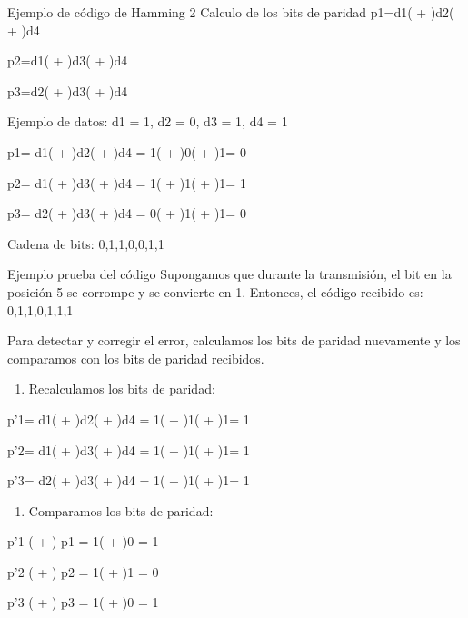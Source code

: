 \documentclass[presentation]{beamer}
\begin{document}
\begin{frame}[label={sec:org555a910}]{Ejemplo de código de Hamming 2}
Calculo de los bits de paridad
p1=d1( + )d2( + )d4

p2=d1( + )d3( + )d4

p3=d2( + )d3( + )d4

Ejemplo de datos:
d1 = 1, d2 = 0, d3 = 1, d4 = 1

p1= d1( + )d2( + )d4 = 1( + )0( + )1= 0

p2= d1( + )d3( + )d4 = 1( + )1( + )1= 1

p3= d2( + )d3( + )d4 = 0( + )1( + )1= 0

Cadena de bits: 0,1,1,0,0,1,1
\end{frame}

\begin{frame}[label={sec:org6e7dd0b}]{Ejemplo prueba del código}
Supongamos que durante la transmisión, el bit en la posición 5 se corrompe y se convierte en 1. Entonces, el código recibido es:
0,1,1,0,1,1,1

Para detectar y corregir el error, calculamos los bits de paridad nuevamente y los comparamos con los bits de paridad recibidos.

\begin{enumerate}
\item Recalculamos los bits de paridad:
\end{enumerate}
p'1= d1( + )d2( + )d4 = 1( + )1( + )1= 1

p'2= d1( + )d3( + )d4 = 1( + )1( + )1= 1

p'3= d2( + )d3( + )d4 = 1( + )1( + )1= 1

\begin{enumerate}
\item Comparamos los bits de paridad:
\end{enumerate}
p'1 ( + ) p1 = 1( + )0 = 1

p'2 ( + ) p2 = 1( + )1 = 0

p'3 ( + ) p3 = 1( + )0 = 1
\end{frame}
\end{document}
